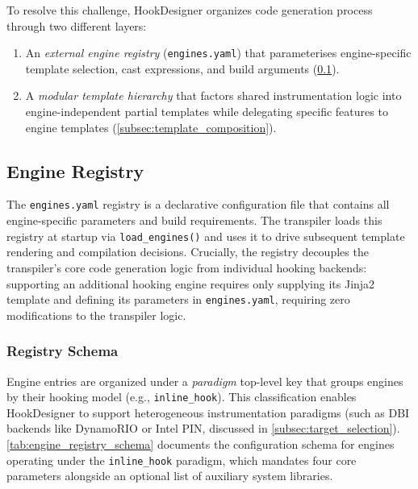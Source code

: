 To resolve this challenge, HookDesigner organizes code generation process through two different layers:
\begin{enumerate}
	\item An \emph{external engine registry} (\texttt{engines.yaml}) that parameterises engine-specific template selection, cast expressions, and build arguments (\cref{subsec:engine_registry}).
	\item A \emph{modular template hierarchy} that factors shared instrumentation logic into engine-independent partial templates while delegating specific features to engine templates (\cref{subsec:template_composition}).
\end{enumerate}

\subsection{Engine Registry}
\label{subsec:engine_registry}

The \texttt{engines.yaml} registry is a declarative configuration file  that contains all engine-specific parameters and build requirements.
The transpiler loads this registry at startup via \texttt{load\_engines()} and uses it to drive subsequent template rendering and compilation decisions.
Crucially, the registry decouples the transpiler's core code generation logic from individual hooking backends: supporting an additional hooking engine requires only supplying its Jinja2 template and defining its parameters in \texttt{engines.yaml}, requiring zero modifications to the transpiler logic.

\subsubsection{Registry Schema}

Engine entries are organized under a \emph{paradigm} top-level key that groups engines by their hooking model (e.g., \texttt{inline\_hook}).
This classification enables HookDesigner to support heterogeneous instrumentation paradigms (such as \ac{DBI} backends like DynamoRIO or Intel PIN, discussed in \cref{subsec:target_selection}).
\cref{tab:engine_registry_schema} documents the configuration schema for engines operating under the \texttt{inline\_hook} paradigm, which mandates four core parameters alongside an optional list of auxiliary system libraries.

